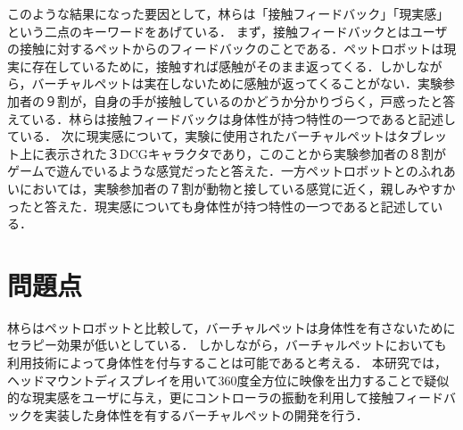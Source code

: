 このような結果になった要因として，林らは「接触フィードバック」「現実感」という二点のキーワードをあげている．
まず，接触フィードバックとはユーザの接触に対するペットからのフィードバックのことである．ペットロボットは現実に存在しているために，接触すれば感触がそのまま返ってくる．しかしながら，バーチャルペットは実在しないために感触が返ってくることがない．実験参加者の９割が，自身の手が接触しているのかどうか分かりづらく，戸惑ったと答えている．林らは接触フィードバックは身体性が持つ特性の一つであると記述している．
次に現実感について，実験に使用されたバーチャルペットはタブレット上に表示された３DCGキャラクタであり，このことから実験参加者の８割がゲームで遊んでいるような感覚だったと答えた．一方ペットロボットとのふれあいにおいては，実験参加者の７割が動物と接している感覚に近く，親しみやすかったと答えた．現実感についても身体性が持つ特性の一つであると記述している．

\section{問題点}
林らはペットロボットと比較して，バーチャルペットは身体性を有さないためにセラピー効果が低いとしている．
しかしながら，バーチャルペットにおいても利用技術によって身体性を付与することは可能であると考える．
本研究では，ヘッドマウントディスプレイを用いて360度全方位に映像を出力することで疑似的な現実感をユーザに与え，更にコントローラの振動を利用して接触フィードバックを実装した身体性を有するバーチャルペットの開発を行う．
